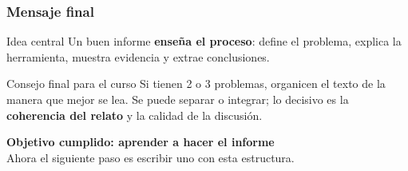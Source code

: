 \begin{frame}
\frametitle{Mensaje final}
\begin{alertblock}{Idea central}
Un buen informe \textbf{ense\~na el proceso}: define el problema, explica la herramienta, muestra evidencia y extrae conclusiones.
\end{alertblock}

\vspace{0.25cm}
\begin{block}{Consejo final para el curso}
Si tienen 2 o 3 problemas, organicen el texto de la manera que mejor se lea. Se puede separar o integrar; lo decisivo es la \textbf{coherencia del relato} y la calidad de la discusi\'on.
\end{block}

\vspace{0.25cm}
\centering
{\Large \textbf{Objetivo cumplido: aprender a hacer el informe}}\\[0.2cm]
\small Ahora el siguiente paso es escribir uno con esta estructura.
\end{frame}


